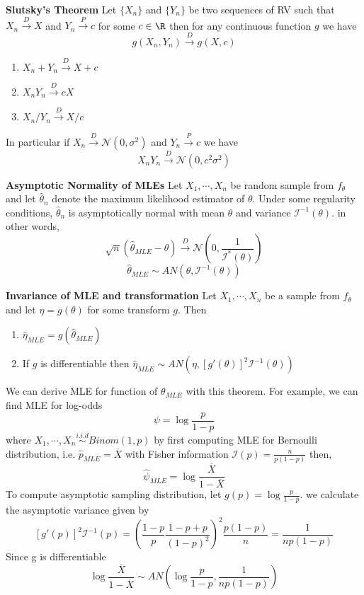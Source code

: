 \documentclass[11pt]{article}
\begin{document}
\begin{theorem*}
  \textbf{Slutsky's Theorem} Let $\{ X_n \}$ and $\{ Y_n \}$ be two sequences of RV such that $X_n \stackrel{D}{\to} X$ and $Y_n \stackrel{P}{\to} c$ for some $c\in\R$ then for any continuous function $g$ we have
  \[
    g(X_n, Y_n) \stackrel{D}{\to} g(X, c)
  \]
  \begin{enumerate}
    \item $X_n + Y_n \stackrel{D}{\to} X + c$
    \item $X_n Y_n \stackrel{D}{\to} cX$
    \item $X_n / Y_n \stackrel{D}{\to} X / c$
  \end{enumerate}
  In particular if $X_n \stackrel{D}{\to} \mathcal{N}(0,\sigma^2)$ and $Y_n \stackrel{P}{\to} c$ we have
  \[
    X_n Y_n \stackrel{D}{\to} \mathcal{N}(0, c^2 \sigma^2)
  \]
\end{theorem*}


\begin{theorem*}
  \textbf{Asymptotic Normality of MLEs} Let $X_1, \cdots, X_n$ be random sample from $f_{\theta}$ and let $\hat{\theta}_n$ denote the maximum likelihood estimator of $\theta$. Under some regularity conditions, $\hat{\theta}_n$ is asymptotically normal with mean $\theta$ and variance $\mathcal{I}^{-1}(\theta)$. in other words,
  \[
    \sqrt{n}(\hat{\theta}_{MLE} - \theta) \stackrel{D}{\to}\mathcal{N}(0, \frac{1}{\mathcal{I}^{*}(\theta)})
  \]
  \[
    \hat{\theta}_{MLE} \sim AN(\theta, \mathcal{I}^{-1}(\theta))
  \]
\end{theorem*}


\begin{theorem*}
  \textbf{Invariance of MLE and transformation}
  Let $X_1, \cdots, X_n$ be a sample from $f_{\theta}$ and let $\eta = g(\theta)$ for some transform $g$. Then
  \begin{enumerate}
    \item $\hat{\eta}_{MLE} = g(\hat{\theta}_{MLE})$
    \item If $g$ is differentiable then $\hat{\eta}_{MLE} \sim AN(\eta, [g'(\theta)]^2 \mathcal{I}^{-1}(\theta))$
  \end{enumerate}
  \begin{rem}
    We can derive MLE for function of $\theta_{MLE}$ with this theorem. For example, we can find MLE for log-odds
    \[
      \psi = \log \frac{p}{1-p}
    \]
    where $X_1, \cdots, X_n \stackrel{i.i.d}{\sim} Binom(1,p)$ by first computing MLE for Bernoulli distribution, i.e. $\hat{p}_{MLE} = \overline{X}$ with Fisher information $\mathcal{I}(p) = \frac{n}{p(1-p)}$ then,
    \[
      \hat{\psi}_{MLE} = \log \frac{\overline{X}}{1 - \overline{X}}
    \]
    To compute asymptotic sampling distribution, let $g(p) = \log \frac{p}{1-p}$. we calculate the asymptotic variance given by
    \[
      [g'(p)]^2 \mathcal{I}^{-1}(p) = (\frac{1-p}{p} \frac{1-p+p}{(1-p)^2})^2 \frac{p(1-p)}{n} = \frac{1}{np(1-p)}
    \]
    Since g is differentiable
    \[
      \log \frac{\overline{X}}{1 - \overline{X}} \sim AN(\log \frac{p}{1-p}, \frac{1}{np(1-p)})
    \]
  \end{rem}
\end{theorem*}
\end{document}
